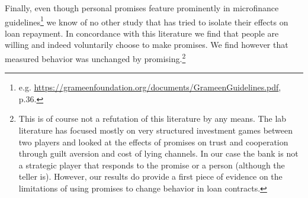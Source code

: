 \documentclass[oneside,11pt]{article}
\begin{document}
Finally, even though personal promises feature prominently in microfinance guidelines\footnote{e.g. \url{https://grameenfoundation.org/documents/GrameenGuidelines.pdf}, p.36.} we know of no other study that has tried to isolate their effects on loan repayment.  In concordance with this literature we find that people are willing and indeed voluntarily choose to make promises. We find however that measured behavior was unchanged by promising.\footnote{This is of course not a refutation of this literature by any means. %
The lab literature has focused mostly on very structured investment games between two players and looked at the effects of promises on trust and cooperation through guilt aversion and cost of lying channels. In our case the bank is not a strategic player that responds to the promise or a person (although the teller is). However, our results do provide a first piece of evidence on the limitations of using promises to change behavior in loan contracts.}



\end{document}
